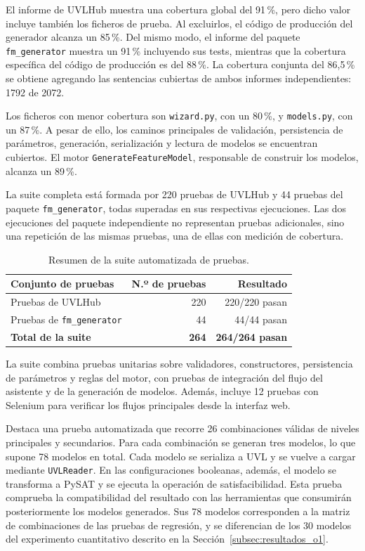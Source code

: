 El informe de UVLHub muestra una cobertura global del 91\,\%, pero dicho valor
incluye también los ficheros de prueba. Al excluirlos, el código de producción
del generador alcanza un 85\,\%. Del mismo modo, el informe del paquete
\texttt{fm\_generator} muestra un 91\,\% incluyendo sus tests, mientras que la
cobertura específica del código de producción es del 88\,\%.
La cobertura conjunta del 86,5\,\% se obtiene agregando las sentencias
cubiertas de ambos informes independientes: 1792 de 2072.

Los ficheros con menor cobertura son \texttt{wizard.py}, con un 80\,\%, y
\texttt{models.py}, con un 87\,\%. A pesar de ello, los caminos principales de
validación, persistencia de parámetros, generación, serialización y lectura de
modelos se encuentran cubiertos. El motor
\texttt{GenerateFeatureModel}, responsable de construir los modelos, alcanza
un 89\,\%.

La suite completa está formada por 220 pruebas de UVLHub y 44 pruebas del
paquete \texttt{fm\_generator}, todas superadas en sus respectivas ejecuciones.
Las dos ejecuciones del paquete independiente no representan pruebas
adicionales, sino una repetición de las mismas pruebas, una de ellas con
medición de cobertura.

\begin{table}[H]
\centering
\small
\begin{tabular}{@{}P{7cm} r r@{}}
\toprule
\textbf{Conjunto de pruebas} & \textbf{N.º de pruebas} &
\textbf{Resultado} \\
\midrule
Pruebas de UVLHub &
220 & 220/220 pasan \\

Pruebas de \texttt{fm\_generator} &
44 & 44/44 pasan \\

\midrule
\textbf{Total de la suite} &
\textbf{264} & \textbf{264/264 pasan} \\
\bottomrule
\end{tabular}
\caption{Resumen de la suite automatizada de pruebas.}
\label{tab:resumen_suite}
\end{table}


La suite combina pruebas unitarias sobre validadores, constructores,
persistencia de parámetros y reglas del motor, con pruebas de integración del
flujo del asistente y de la generación de modelos. Además, incluye
12 pruebas con Selenium para verificar los flujos principales desde la
interfaz web.

Destaca una prueba automatizada que recorre 26 combinaciones válidas
de niveles principales y secundarios. Para cada combinación se generan tres
modelos, lo que supone 78 modelos en total. Cada modelo se serializa a UVL y
se vuelve a cargar mediante \texttt{UVLReader}. En las configuraciones
booleanas, además, el modelo se transforma a PySAT y se ejecuta la operación
de satisfacibilidad. Esta prueba comprueba la compatibilidad del resultado con
las herramientas que consumirán posteriormente los modelos generados. Sus 78
modelos corresponden a la matriz de combinaciones de las pruebas de regresión,
y se diferencian de los 30 modelos del experimento cuantitativo descrito en la
Sección~\ref{subsec:resultados_o1}.

